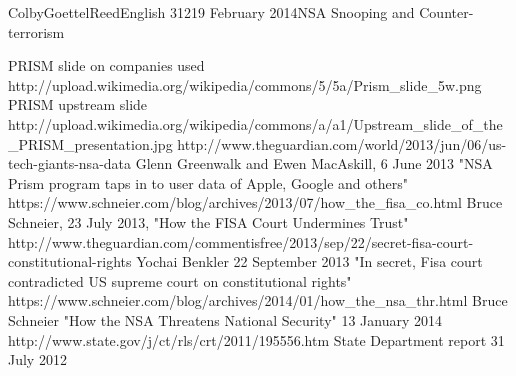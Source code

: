 \documentclass[12pt]{article}
\begin{document}
\begin{mla}{Colby}{Goettel}{Reed}{English 312}{19 February 2014}{NSA Snooping and Counter-terrorism}
\begin{workscited}
    \bibent PRISM slide on companies used http://upload.wikimedia.org/wikipedia/commons/5/5a/Prism\_slide\_5w.png
    \bibent PRISM upstream slide http://upload.wikimedia.org/wikipedia/commons/a/a1/Upstream\_slide\_of\_the\_PRISM\_presentation.jpg
    \bibent http://www.theguardian.com/world/2013/jun/06/us-tech-giants-nsa-data Glenn Greenwalk and Ewen MacAskill, 6 June 2013 "NSA Prism program taps in to user data of Apple, Google and others"
    \bibent https://www.schneier.com/blog/archives/2013/07/how\_the\_fisa\_co.html Bruce Schneier, 23 July 2013, "How the FISA Court Undermines Trust"
    \bibent http://www.theguardian.com/commentisfree/2013/sep/22/secret-fisa-court-constitutional-rights Yochai Benkler 22 September 2013 "In secret, Fisa court contradicted US supreme court on constitutional rights"
    \bibent https://www.schneier.com/blog/archives/2014/01/how\_the\_nsa\_thr.html Bruce Schneier "How the NSA Threatens National Security" 13 January 2014
    \bibent http://www.state.gov/j/ct/rls/crt/2011/195556.htm State Department report 31 July 2012
\end{workscited}

\end{mla}
\end{document}
